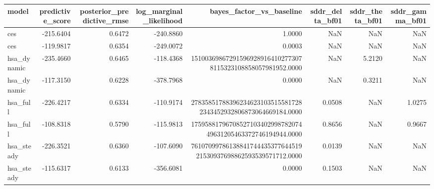 \begin{tabular}{lrrrrrrr}
\toprule
model & predictive\_score & posterior\_predictive\_rmse & log\_marginal\_likelihood & bayes\_factor\_vs\_baseline & sddr\_delta\_bf01 & sddr\_theta\_bf01 & sddr\_gamma\_bf01 \\
\midrule
ces & -215.6404 & 0.6472 & -240.8860 & 1.0000 & NaN & NaN & NaN \\
ces & -119.9817 & 0.6354 & -249.0072 & 0.0003 & NaN & NaN & NaN \\
hsa\_dynamic & -235.4660 & 0.6465 & -118.4368 & 151003698672915969289164102773078115323108858057981952.0000 & NaN & 5.2120 & NaN \\
hsa\_dynamic & -117.3150 & 0.6228 & -378.7968 & 0.0000 & NaN & 0.3211 & NaN \\
hsa\_full & -226.4217 & 0.6334 & -110.9174 & 278358517883962346231035155817282343452932806873064669184.0000 & 0.0508 & NaN & 1.0275 \\
hsa\_full & -108.8318 & 0.5790 & -115.9813 & 1759588179670852710340299878207449631205463372746194944.0000 & 0.8656 & NaN & 0.9667 \\
hsa\_steady & -226.3521 & 0.6360 & -107.6090 & 7610709978613884174443537764451921530937698862593539571712.0000 & 0.0139 & NaN & NaN \\
hsa\_steady & -115.6317 & 0.6133 & -356.6081 & 0.0000 & 0.1503 & NaN & NaN \\
\bottomrule
\end{tabular}

